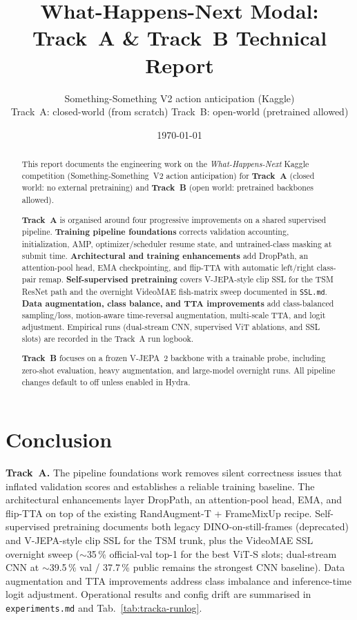 \documentclass[11pt,a4paper]{article}
\title{\textbf{What-Happens-Next Modal:\\
       Track~A \& Track~B Technical Report}}
\author{Something-Something V2 action anticipation (Kaggle)\\
        \small Track~A: closed-world (from scratch) \quad
        Track~B: open-world (pretrained allowed)}
\date{\today}
\newcommand{\file}[1]{\texttt{\small #1}}
\begin{document}
\maketitle

\begin{abstract}
This report documents the engineering work on the \emph{What-Happens-Next}
Kaggle competition (Something-Something~V2 action anticipation) for
\textbf{Track~A} (closed world: no external pretraining) and
\textbf{Track~B} (open world: pretrained backbones allowed).

\textbf{Track~A} is organised around four progressive improvements on a shared
supervised pipeline. \textbf{Training pipeline foundations} corrects validation
accounting, initialization, AMP, optimizer/scheduler resume state, and
untrained-class masking at submit time. \textbf{Architectural and training
enhancements} add DropPath, an attention-pool head, EMA checkpointing, and
flip-TTA with automatic left/right class-pair remap. \textbf{Self-supervised
pretraining} covers V-JEPA-style clip SSL for the TSM ResNet path and the
overnight VideoMAE fish-matrix sweep documented in \file{SSL.md}. \textbf{Data
augmentation, class balance, and TTA improvements} add class-balanced
sampling/loss, motion-aware time-reversal augmentation, multi-scale TTA, and
logit adjustment. Empirical runs (dual-stream CNN, supervised ViT ablations,
and SSL slots) are recorded in the Track~A run logbook.

\textbf{Track~B} focuses on a frozen V-JEPA~2 backbone with a trainable probe,
including zero-shot evaluation, heavy augmentation, and large-model overnight
runs. All pipeline changes default to off unless enabled in Hydra.
\end{abstract}

\tableofcontents
\clearpage


\clearpage


\clearpage
\renewcommand{\trackcolor}{black}
\renewcommand{\trackname}{Report}

\section{Conclusion}
\label{sec:conclusion}

\textbf{Track~A.} The pipeline foundations work removes silent correctness
issues that inflated validation scores and establishes a reliable training
baseline. The architectural enhancements layer DropPath, an attention-pool
head, EMA, and flip-TTA on top of the existing RandAugment-T + FrameMixUp
recipe. Self-supervised pretraining documents both legacy DINO-on-still-frames
(deprecated) and V-JEPA-style clip SSL for the TSM trunk, plus the VideoMAE
SSL overnight sweep (\(\sim\)35\,\% official-val top-1 for the best ViT-S
slots; dual-stream CNN at \(\sim\)39.5\,\% val / 37.7\,\% public remains the
strongest CNN baseline). Data augmentation and TTA improvements address class
imbalance and inference-time logit adjustment. Operational results and config
drift are summarised in \file{experiments.md} and Tab.~\ref{tab:tracka-runlog}.
\end{document}

